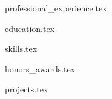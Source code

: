 \documentclass{resume} %
\begin{document}
\vspace{-0.5em}

{professional_experience.tex}

{education.tex}


{skills.tex}

{honors_awards.tex}

{projects.tex}


\end{document}
